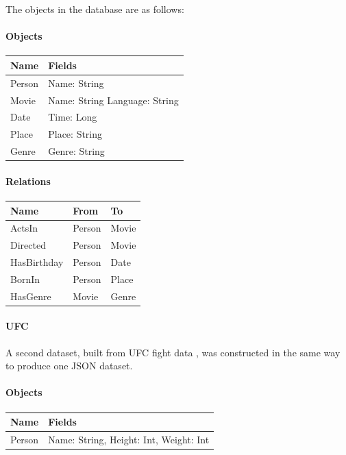 \documentclass[12pt,a4paper,twoside,openright]{report}
\let\oldparagraph\paragraph
\renewcommand{\paragraph}[1]{\oldparagraph{#1}\mbox{}}
\begin{document}
The objects in the database are as follows:
\paragraph{Objects}
\begin{center}
	\begin{tabular}{ |p{3cm}| p{3cm}|}
	\hline
	Name & Fields \\ \hline
	Person & Name: String \\ \hline
	Movie & Name: String Language: String \\ \hline
	Date & Time: Long \\ \hline
	Place & Place: String \\ \hline
	Genre &	Genre: String \\ \hline
	\end{tabular}
\end{center}

\paragraph{Relations}
\begin{center}
	\begin{tabular}{ |p{3cm}|| p{3cm}| p{3cm}|}
	\hline
		Name &  From & To \\ \hline
		ActsIn & Person & Movie \\ \hline
		Directed & Person & Movie\\ \hline
		HasBirthday &Person & Date\\ \hline
		BornIn & Person & Place\\ \hline
		HasGenre & Movie & Genre\\ \hline
	\end{tabular}
\end{center}

		\paragraph{UFC}
		
		A second dataset, built from UFC fight data \cite{UFC}, was constructed in the same way to produce one JSON dataset.
		
		\paragraph{Objects}
\begin{center}
	\begin{tabular}{ |p{3cm}| p{9cm}|}
	\hline
		Name & Fields \\ \hline
		Person & Name: String, Height: Int, Weight: Int\\ \hline
	\end{tabular}
\end{center}
\end{document}
